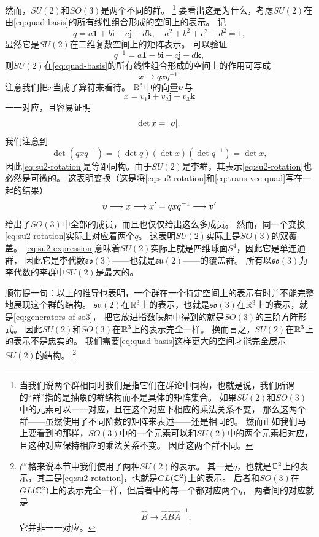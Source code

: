 然而，$SU(2)$和$SO(3)$是两个不同的群。%
\footnote{当我们说两个群相同时我们是指它们在群论中同构，也就是说，我们所谓的“群”指的是抽象的群结构而不是具体的矩阵集合。
如果$SU(2)$和$SO(3)$中的元素可以一一对应，且在这个对应下相应的乘法关系不变，
那么这两个群——虽然使用了不同阶数的矩阵来表述——还是相同的。
然而正如我们马上要看到的那样，$SO(3)$中的一个元素可以和$SU(2)$中的两个元素相对应，且这种对应保持相应的乘法关系不变。
因此这两个群不同。}%
要看出这是为什么，考虑$SU(2)$在由\eqref{eq:quad-basis}的所有线性组合形成的空间上的表示。
记
\[
    q = a \mathbf{1} + b \mathbf{i} + c \mathbf{j} + d \mathbf{k}, \quad a^2 + b^2 + c^2 + d^2 = 1,
\]
显然它是$SU(2)$在二维复数空间上的矩阵表示。
可以验证
\[
    q^{-1} = a \mathbf{1} - b \mathbf{i} - c \mathbf{j} - d \mathbf{k},
\]
则$SU(2)$在\eqref{eq:quad-basis}的所有线性组合形成的空间上的作用可写成
\begin{equation}
    x \longrightarrow q x q^{-1}.
    \label{eq:su2-rotation}
\end{equation}
注意我们把$x$当成了算符来看待。
$\mathbb{R}^3$中的向量$\vb*{v}$与
\begin{equation}
    x = v_1 \mathbf{i} + v_2 \mathbf{j} + v_3 \mathbf{k}
    \label{eq:trans-vec-quad}
\end{equation}
一一对应，且容易证明
\[
    \det x = \abs{\vb*{v}}.
\]
我们注意到
\[
    \det (q x q^{-1}) = (\det q) (\det x) (\det q^{-1}) = \det x,
\]
因此\eqref{eq:su2-rotation}是等距同构。由于$SU(2)$是李群，其表示\eqref{eq:su2-rotation}也必然是可微的。
这表明变换（这是将\eqref{eq:su2-rotation}和\eqref{eq:trans-vec-quad}写在一起的结果）
\[
    \vb*{v} \longrightarrow x \longrightarrow x' = q x q^{-1} \longrightarrow \vb*{v}'
\]
给出了$SO(3)$中全部的成员，而且也仅仅给出这么多成员。
然而，同一个变换\eqref{eq:su2-rotation}实际上对应着两个$q$。
这表明$SU(2)$实际上是$SO(3)$的双覆盖。
\eqref{eq:su2-expression}意味着$SU(2)$实际上就是四维球面$S^4$，因此它是单连通群，
因此它是李代数$\mathfrak{so}(3)$——也就是$\mathfrak{su}(2)$——的覆盖群。
所有以$\mathfrak{so}(3)$为李代数的李群中$SU(2)$是最大的。

顺带提一句：以上的推导也表明，一个群在一个特定空间上的表示有时并不能完整地展现这个群的结构。
$\mathfrak{su}(2)$在$\mathbb{R}^3$上的表示，也就是$\mathfrak{so}(3)$在$\mathbb{R}^3$上的表示，就是\eqref{eq:generators-of-so3}，
把它放进指数映射中得到的就是$SO(3)$的三阶方阵形式。
因此$SU(2)$和$SO(3)$在$\mathbb{R}^3$上的表示完全一样。
换而言之，$SU(2)$在$\mathbb{R}^3$上的表示不是忠实的。
我们需要\eqref{eq:quad-basis}这样更大的空间才能完全展示$SU(2)$的结构。%
\footnote{严格来说本节中我们使用了两种$SU(2)$的表示。
其一是$q$，也就是$\mathbb{C}^2$上的表示，其二是\eqref{eq:su2-rotation}，也就是$GL(\mathbb{C}^2)$上的表示。
后者和$SO(3)$在$GL(\mathbb{C}^2)$上的表示完全一样，但后者中的每一个都对应两个$q$，
两者间的对应就是
\[
    \hat{B} \longrightarrow \hat{A} \hat{B} \hat{A}^{-1},
\]
它并非一一对应。}

